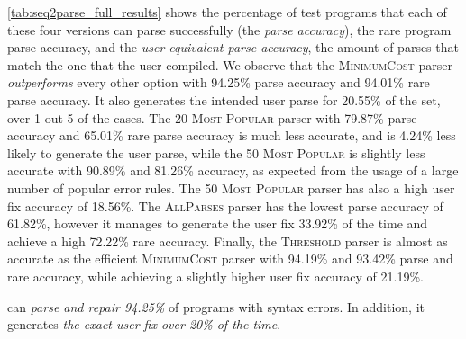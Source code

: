 \autoref{tab:seq2parse_full_results} shows the percentage of test programs that
each of these four versions can parse successfully (\ie the \emph{parse
accuracy}), the rare program parse accuracy, and the \emph{user equivalent parse
accuracy}, \ie the amount of parses that match the one that the user compiled.
We observe that the \textsc{MinimumCost} parser \emph{outperforms} every other
option with 94.25\% parse accuracy and 94.01\% rare parse accuracy. It also
generates the intended user parse for 20.55\% of the set, \ie over 1 out 5 of
the cases. The \textsc{20 Most Popular} parser with 79.87\% parse accuracy and
65.01\% rare parse accuracy is much less accurate, and is 4.24\% less likely to
generate the user parse, while the \textsc{50 Most Popular} is slightly less
accurate with 90.89\% and 81.26\% accuracy, as expected from the usage of a
large number of popular error rules. The \textsc{50 Most Popular} parser has
also a high user fix accuracy of 18.56\%. The \textsc{AllParses} parser has the
lowest parse accuracy of 61.82\%, however it manages to generate the user fix
33.92\% of the time and achieve a high 72.22\% rare accuracy. Finally, the
\textsc{Threshold} parser is almost as accurate as the efficient
\textsc{MinimumCost} parser with 94.19\% and 93.42\% parse and rare accuracy,
while achieving a slightly higher user fix accuracy of 21.19\%.

\begin{framed}
  \noindent \toolname can \emph{parse and repair 94.25\%} of programs with
  syntax errors. In addition, it generates \emph{the exact user fix over 20\% of
  the time}.
\end{framed}

